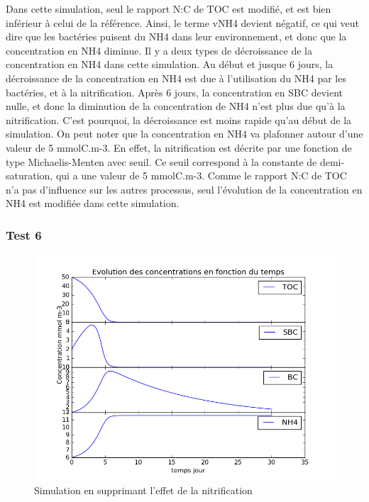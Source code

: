 \par{
Dans cette simulation, seul le rapport N:C de TOC est modifi\'e, et est bien inf\'erieur \`a celui de la
r\'ef\'erence. Ainsi, le terme vNH4 devient n\'egatif, ce qui veut dire que les bact\'eries puisent du NH4
dans leur environnement, et donc que la concentration en NH4 diminue. Il y a deux types de d\'ecroissance de
la concentration en NH4 dans cette simulation. Au d\'ebut et jusque 6 jours, la d\'ecroissance de la
concentration en NH4 est due \`a l'utilisation du NH4 par les bact\'eries, et \`a la nitrification. Apr\`es
6 jours, la concentration en SBC devient nulle, et donc la diminution de la concentration de NH4 n'est plus
due qu'\`a la nitrification. C'est pourquoi, la d\'ecroissance est moins rapide qu'au d\'ebut de la simulation.
On peut noter que la concentration en NH4 va plafonner autour d'une valeur de 5 mmolC.m-3. En effet, la
nitrification est d\'ecrite par une fonction de type Michaelis-Menten avec seuil. Ce seuil correspond \`a la
constante de demi-saturation, qui a une valeur de 5 mmolC.m-3. Comme le rapport N:C de TOC n'a pas d'influence
sur les autres processus, seul l'\'evolution de la concentration en NH4 est modifi\'ee dans cette simulation.
}

\FloatBarrier
\subsubsection{Test 6}

\begin{figure}[h!]
  \includegraphics[width=\textwidth]{partie1/Test6.png}
  \caption{Simulation en supprimant l'effet de la nitrification
  }
  \label{fig:partie1test6}
\end{figure}

